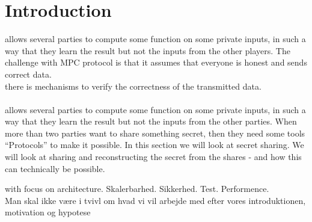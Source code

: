 \section{Introduction}
  allows several parties to compute some function on some private inputs, in such a way that they learn the result but not the inputs from the other players.  The challenge with MPC protocol is that it assumes that everyone is honest and sends correct data. \\


 there is mechanisms to verify the correctness of the transmitted data.\\\\

 allows several parties to compute some function on some private inputs, in such a way that they learn the result but not the inputs from the other parties. When more than two parties want to share something secret, then they need some tools “Protocols” to make it possible. In this section we will look at secret sharing. We will look at sharing and reconstructing the secret from the shares - and how this can technically be possible. 

 with focus on architecture. Skalerbarhed. Sikkerhed. Test. Performence. \\



\noindent
Man skal ikke være i tvivl om hvad vi vil arbejde med efter vores introduktionen, motivation og hypotese

